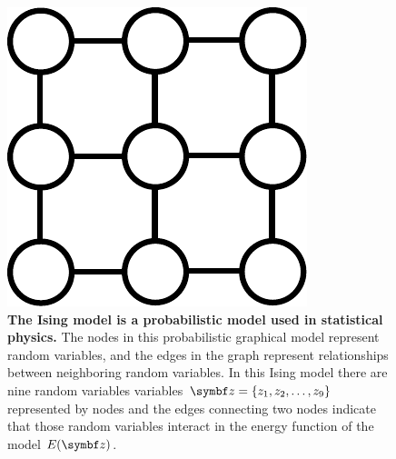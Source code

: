 \begin{figure}[t]
  \centering
  \includegraphics[height=0.2\paperheight]{fig/graphical-model-ising.pdf}
  \caption[Ising model as a probabilistic model]{
  \textbf{The Ising model is a probabilistic model used in statistical physics.} The nodes in this probabilistic graphical model represent random variables, and the edges in the graph represent relationships between neighboring random variables. In this Ising model there are nine random variables variables $\mbz = \{z_1, z_2, \ldots, z_9\}$ represented by nodes and the edges connecting two nodes indicate that those random variables interact in the energy function of the model $E(\mbz)$.}
  \label{fig:graphical-model-ising}
\end{figure}